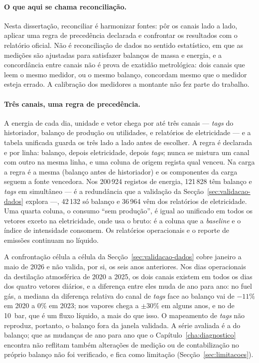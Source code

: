 \paragraph{O que aqui se chama reconciliação.} Nesta dissertação,
reconciliar é harmonizar fontes: pôr os canais lado a lado, aplicar uma
regra de precedência declarada e confrontar os resultados com o relatório
oficial. Não é reconciliação de dados no sentido estatístico, em que as
medições são ajustadas para satisfazer balanços de massa e energia, e a
concordância entre canais não é prova de exatidão metrológica: dois canais
que leem o mesmo medidor, ou o mesmo balanço, concordam mesmo que o medidor
esteja errado. A calibração dos medidores a montante não fez parte do
trabalho.

\paragraph{Três canais, uma regra de precedência.} A energia de cada
dia, unidade e vetor chega por até três canais --- \emph{tags} do
historiador, balanço de produção ou utilidades, e relatórios de
eletricidade --- e a tabela unificada guarda os três lado a lado antes de
escolher. A regra é declarada e por linha: balanço, depois eletricidade,
depois \emph{tags}; nunca se mistura um canal com outro na mesma linha, e
uma coluna de origem regista qual venceu. Na carga a regra é a mesma
(balanço antes de historiador) e os componentes da carga seguem a fonte
vencedora. Nos 200\,924 registos de energia, 121\,828 têm balanço e
\emph{tags} em simultâneo --- é a redundância que a validação da
Secção~\ref{sec:validacao-dados} explora ---, 42\,132 só balanço e 36\,964
vêm dos relatórios de eletricidade. Uma quarta coluna, o consumo ``sem
produção'', é igual ao unificado em todos os vetores exceto na
eletricidade, onde usa o bruto: é a coluna que a \emph{baseline} e o índice
de intensidade consomem. Os relatórios operacionais e o reporte de
emissões continuam no líquido.

A confrontação célula a célula da Secção~\ref{sec:validacao-dados} cobre
janeiro a maio de 2026 e não valida, por si, os seis anos anteriores. Nos
dias operacionais da destilação atmosférica de 2020 a 2025, os dois canais
existem em todos os dias dos quatro vetores diários, e a diferença entre
eles muda de ano para ano: no fuel gás, a mediana da diferença relativa do
canal de \emph{tags} face ao balanço vai de $-11\%$ em 2020 a $0\%$ em 2023;
nos vapores chega a $\pm30\%$ em alguns anos, e no de 10~bar, que é um fluxo
líquido, a mais do que isso. O mapeamento de \emph{tags} não reproduz, portanto,
o balanço fora da janela validada. A série avaliada é a do balanço; que as
mudanças de ano para ano que o Capítulo~\ref{cha:diagnostico} encontra não
reflitam também alterações de medição ou de contabilização no próprio
balanço não foi verificado, e fica como limitação
(Secção~\ref{sec:limitacoes}).


